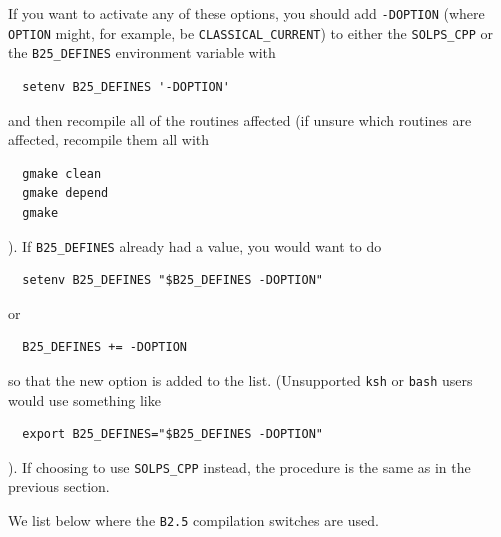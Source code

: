 \documentclass[a4paper,10pt]{report}
\begin{document}
If you want to activate any of these options, you should add
{\tt -DOPTION} (where {\tt OPTION} might, for example, be
{\tt CLASSICAL\_CURRENT}) to either the {\tt SOLPS\_CPP}
or the {\tt B25\_DEFINES} environment variable with
\begin{verbatim}
  setenv B25_DEFINES '-DOPTION'
\end{verbatim}
and then recompile all of the routines affected (if unsure which
routines are affected, recompile them all with
\begin{verbatim}
  gmake clean
  gmake depend
  gmake
\end{verbatim}
).  If {\tt B25\_DEFINES} already had a value, you would want to do
\begin{verbatim}
  setenv B25_DEFINES "$B25_DEFINES -DOPTION"
\end{verbatim}
or
\begin{verbatim}
  B25_DEFINES += -DOPTION
\end{verbatim}
so that the new option is added to the list. (Unsupported {\tt ksh}
or {\tt bash} users would use something like
\begin{verbatim}
  export B25_DEFINES="$B25_DEFINES -DOPTION"
\end{verbatim}
). If choosing to use {\tt SOLPS\_CPP} instead, the procedure is the same as
in the previous section.


We list below where the {\tt B2.5} compilation switches are used.
\end{document}
